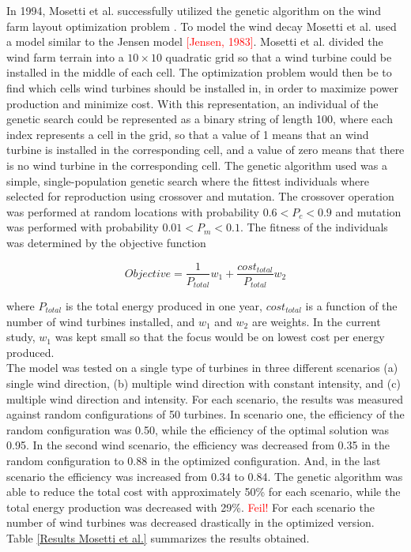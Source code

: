 In 1994, Mosetti et al. successfully utilized the genetic algorithm on the wind farm layout optimization problem {\citep{Mosetti}}. To model the wind decay Mosetti et al. used a model similar to the Jensen model \textcolor{red}{[Jensen, 1983]}. Mosetti et al. divided the wind farm terrain into a $10\times10$ quadratic grid so that a wind turbine could be installed in the middle of each cell. The optimization problem would then be to find which cells wind turbines should be installed in, in order to maximize power production and minimize cost. With this representation, an individual of the genetic search could be represented as a binary string of length 100, where each index represents a cell in the grid, so that a value of 1 means that an wind turbine is installed in the corresponding cell, and a value of zero means that there is no wind turbine in the corresponding cell. The genetic algorithm used was a simple, single-population genetic search where the fittest individuals where selected for reproduction using crossover and mutation. The crossover operation was performed at random locations with probability $0.6 < P_c < 0.9$ and mutation was performed with probability $0.01 < P_m < 0.1$. The fitness of the individuals was determined by the objective function

\begin{equation}
Objective = \frac{1}{P_{total}}w_1 + \frac{cost_{total}}{P_{total}}w_2
\label{Objective function Mosetti et al.}
\end{equation}

where $P_{total}$ is the total energy produced in one year, $cost_{total}$ is a function of the number of wind turbines installed, and $w_1$ and $w_2$ are weights. In the current study, $w_1$ was kept small so that the focus would be on lowest cost per energy produced. \\

\noindent The model was tested on a single type of turbines in three different scenarios (a) single wind direction, (b) multiple wind direction with constant intensity, and (c) multiple wind direction and intensity. For each scenario, the results was measured against random configurations of 50 turbines. In scenario one, the efficiency of the random configuration was 0.50, while the efficiency of the optimal solution was 0.95. In the second wind scenario, the efficiency was decreased from 0.35 in the random configuration to 0.88 in the optimized configuration. And, in the last scenario the efficiency was increased from 0.34 to 0.84. The genetic algorithm was able to reduce the total cost with approximately 50\% for each scenario, while the total energy production was decreased with 29\%. \textcolor{red}{Feil!} For each scenario the number of wind turbines was decreased drastically in the optimized version. Table \ref{Results Mosetti et al.} summarizes the results obtained.

